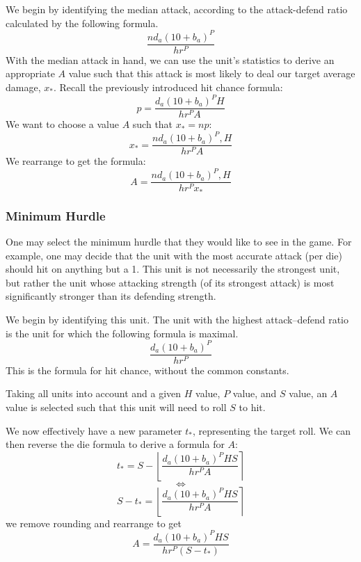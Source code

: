 \documentclass[twocolumn]{article}
\begin{document}
We begin by identifying the median attack,
according to the attack-defend ratio calculated by the following formula.
\[
    \frac
        {n d_a (10 + b_a)^P}
        {h r^P}
\]
With the median attack in hand,
we can use the unit's statistics to derive an appropriate $A$ value
such that this attack is most likely to deal our target average damage, $x_*$.
Recall the previously introduced hit chance formula:
\[
    p = \frac
        {d_a (10 + b_a)^P H}
        {h r^P A}
\]
We want to choose a value $A$ such that $x_* = n p$:
\[
    x_* = \frac
        {n d_a (10 + b_a)^P, H}
        {h r^P A}
\]
We rearrange to get the formula:
\[
    A = \frac
        {n d_a (10 + b_a)^P, H}
        {h r^P x_*}
\]


\subsubsection{Minimum Hurdle}

One may select the minimum hurdle that they would like to see in the game.
For example, one may decide
that the unit with the most accurate attack (per die)
should hit on anything but a 1.
This unit is not necessarily the strongest unit,
but rather the unit whose attacking strength (of its strongest attack)
is most significantly stronger than
its defending strength.

We begin by identifying this unit.
The unit with the highest attack--defend ratio is the unit for which the following formula is maximal.
\[
    \frac
        {d_a (10 + b_a)^P}
        {h r^P}
\]
This is the formula for hit chance, without the common constants.

Taking all units into account and a given $H$ value, $P$ value, and $S$ value,
an $A$ value is selected such that this unit will need to roll $S$ to hit.

We now effectively have a new parameter $t_*$, representing the target roll.
We can then reverse the die formula to derive a formula for $A$:
\[
    t_* =
        S -
        \left\lfloor
            \frac
                {d_a (10 + b_{a})^P H S}
                {h r^P A}
        \right\rceil
\]
\[
    \iff
\]
\[
    S - t_* =
        \left\lfloor
            \frac
                {d_a (10 + b_{a})^P H S}
                {h r^P A}
        \right\rceil
\]
we remove rounding and rearrange to get
\[
    A = 
        \frac
            {d_a (10 + b_{a})^P H S}
            {h r^P (S - t_*)}
\]
\end{document}
